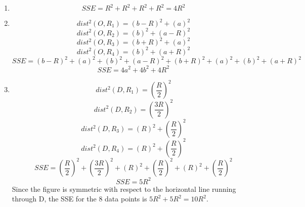 \documentclass{article}
\begin{document}
\begin{enumerate}
    \item 
    \begin{equation}
        SSE = R^2 + R^2 + R^2 + R^2 = 4R^2
    \end{equation}
    \item 
    \begin{equation}
            dist^2(O, R_1) = {(b-R)}^2 + {(a)}^2
    \end{equation}
    \begin{equation}
            dist^2(O, R_2) = {(b)}^2 + {(a-R)}^2
    \end{equation}
    \begin{equation}
            dist^2(O, R_3) = {(b+R)}^2 + {(a)}^2
    \end{equation}
    \begin{equation}
            dist^2(O, R_4) = {(b)}^2 + {(a+R)}^2
    \end{equation}
    \begin{equation}
        SSE = {(b-R)}^2 + {(a)}^2 + {(b)}^2 + {(a-R)}^2 + {(b+R)}^2 + {(a)}^2 + {(b)}^2 + {(a+R)}^2
    \end{equation}
    \begin{equation}
        SSE = 4a^2 + 4b^2 + 4R^2
    \end{equation}
    \item 
    \begin{equation}
        dist^2(D, R_1) = {(\frac{R}{2})}^2
    \end{equation}
    \begin{equation}
        dist^2(D, R_2) = {(\frac{3R}{2})}^2
    \end{equation}
    \begin{equation}
        dist^2(D, R_3) = {(R)}^2 + {(\frac{R}{2})}^2
    \end{equation}
    \begin{equation}
        dist^2(D, R_4) = {(R)}^2 + {(\frac{R}{2})}^2
    \end{equation}
    \begin{equation}
        SSE = {(\frac{R}{2})}^2 + {(\frac{3R}{2})}^2 + {(R)}^2 + {(\frac{R}{2})}^2 + {(R)}^2 + {(\frac{R}{2})}^2
    \end{equation}
    \begin{equation}
        SSE = 5R^2
    \end{equation}
    Since the figure is symmetric with respect to the horizontal line running through D, the SSE for the 8 data points is $5R^2 + 5R^2 = 10R^2$.
\end{enumerate}
\end{document}
